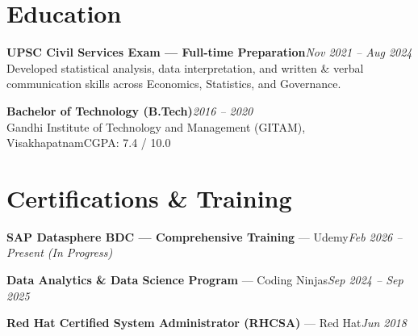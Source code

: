 \documentclass[10pt, letterpaper]{article}
\begin{document}
\section{Education}

{\bfseries UPSC Civil Services Exam — Full-time Preparation}\hfill{\small\color{muted}\textit{Nov 2021 – Aug 2024}}\\
{\small\color{muted}Developed statistical analysis, data interpretation, and written \& verbal communication skills across Economics, Statistics, and Governance.}

\vspace{2pt}
{\bfseries Bachelor of Technology (B.Tech)}\hfill{\small\color{muted}\textit{2016 – 2020}}\\
{\small\color{muted}Gandhi Institute of Technology and Management (GITAM), Visakhapatnam\hfill CGPA: 7.4 / 10.0}

\section{Certifications \& Training}

{\bfseries SAP Datasphere BDC — Comprehensive Training} — Udemy\hfill{\small\color{muted}\textit{Feb 2026 – Present \emph{(In Progress)}}}

\vspace{1pt}
{\bfseries Data Analytics \& Data Science Program} — Coding Ninjas\hfill{\small\color{muted}\textit{Sep 2024 – Sep 2025}}

\vspace{1pt}
{\bfseries Red Hat Certified System Administrator (RHCSA)} — Red Hat\hfill{\small\color{muted}\textit{Jun 2018}}

\end{document}
